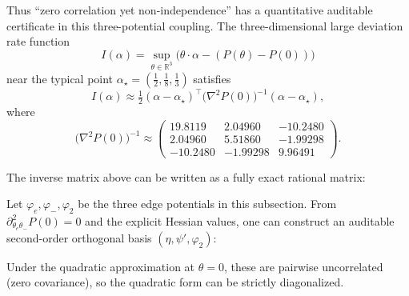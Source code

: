 \noindent
Thus ``zero correlation yet non-independence'' has a quantitative auditable certificate in this three-potential coupling.
The three-dimensional large deviation rate function
\[
I(\alpha)=\sup_{\theta\in\mathbb{R}^3}\bigl(\theta\cdot\alpha-(P(\theta)-P(0))\bigr)
\]
near the typical point $\alpha_\star=(\frac12,\frac18,\frac13)$ satisfies
\[
I(\alpha)\approx \tfrac12(\alpha-\alpha_\star)^\top\bigl(\nabla^2P(0)\bigr)^{-1}(\alpha-\alpha_\star),
\]
where
\[
\bigl(\nabla^2P(0)\bigr)^{-1}\approx
\begin{pmatrix}
19.8119 & 2.04960 & -10.2480\\
2.04960 & 5.51860 & -1.99298\\
-10.2480 & -1.99298 & 9.96491
\end{pmatrix}.
\]
\begin{proposition}\label{prop:sync-kernel-3d-hessian-inverse-exact}
The inverse matrix above can be written as a fully exact rational matrix:

\end{proposition}

\begin{corollary}\label{cor:sync-kernel-3d-orthobasis}
Let \(\varphi_e,\varphi_-,\varphi_2\) be the three edge potentials in this subsection. From \(\partial^2_{\theta_e\theta_-}P(0)=0\) and the explicit Hessian values,
one can construct an auditable second-order orthogonal basis \((\eta,\psi',\varphi_2)\):

Under the quadratic approximation at \(\theta=0\), these are pairwise uncorrelated (zero covariance), so the quadratic form can be strictly diagonalized.
\end{corollary}

